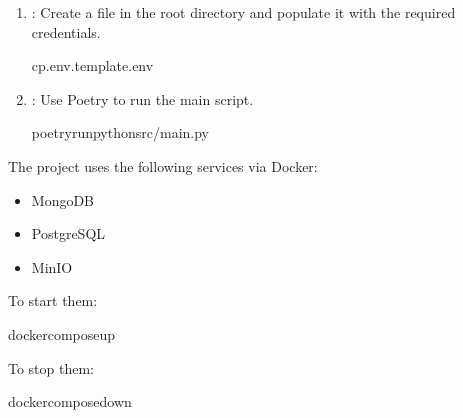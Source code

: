 \documentclass[letterpaper,10pt,english]{sphinxmanual}
\begin{document}
\begin{enumerate}
\item {} 
\sphinxAtStartPar
{}: Create a  file in the root directory and populate it with the required credentials.

\begin{sphinxVerbatim}[commandchars=\\\{\}]
cp.env.template.env
\end{sphinxVerbatim}

\item {} 
\sphinxAtStartPar
{}: Use Poetry to run the main script.

\begin{sphinxVerbatim}[commandchars=\\\{\}]
poetryrunpythonsrc/main.py
\end{sphinxVerbatim}

\end{enumerate}

\sphinxAtStartPar
{}

\sphinxAtStartPar
The project uses the following services via Docker:
\begin{itemize}
\item {} 
\sphinxAtStartPar
MongoDB

\item {} 
\sphinxAtStartPar
PostgreSQL

\item {} 
\sphinxAtStartPar
MinIO

\end{itemize}

\sphinxAtStartPar
To start them:

\begin{sphinxVerbatim}[commandchars=\\\{\}]
dockercomposeup
\end{sphinxVerbatim}

\sphinxAtStartPar
To stop them:

\begin{sphinxVerbatim}[commandchars=\\\{\}]
dockercomposedown
\end{sphinxVerbatim}

\sphinxAtStartPar
{}
\end{document}
